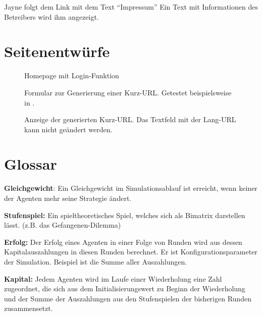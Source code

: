 \documentclass[parskip=full,11pt,twoside]{scrartcl}
\begin{document}
\teststep{}
{Jayne folgt dem Link mit dem Text \enquote{Impressum}}
{Ein Text mit Informationen des Betreibers wird ihm angezeigt.}

\pagebreak
\appendix

\section{Seitenentwürfe}


\begin{figure}[hb]
\caption{\label{fig:homepage}
Homepage mit Login-Funktion
}
\end{figure}

\begin{figure}[hb]
\caption{\label{fig:form}
Formular zur Generierung einer Kurz-URL.
Getestet beispielsweise in .
}
\end{figure}

\begin{figure}[hb]
\caption{\label{fig:generated}
Anzeige der generierten Kurz-URL.
Das Textfeld mit der Lang-URL kann nicht geändert werden.
}
\end{figure}

\section{Glossar}

\textbf{Gleichgewicht}:
Ein Gleichgewicht im Simulationsablauf ist erreicht, wenn keiner der Agenten mehr seine Strategie ändert.

\textbf{Stufenspiel:}
Ein spieltheoretisches Spiel, welches sich als Bimatrix darstellen lässt. (z.B. das Gefangenen-Dilemma)

\textbf{Erfolg:}
Der Erfolg eines Agenten in einer Folge von Runden wird aus dessen Kapitalauszahlungen in diesen Runden berechnet. Er ist Konfigurationsparameter der Simulation. Beispiel ist die Summe aller Auszahlungen.

\textbf{Kapital:}
Jedem Agenten wird im Laufe einer Wiederholung eine Zahl zugeordnet, die sich aus dem Initialisierungswert zu Beginn der Wiederholung und der Summe der Auszahlungen aus den Stufenspielen der bisherigen Runden zusammensetzt.
\end{document}
